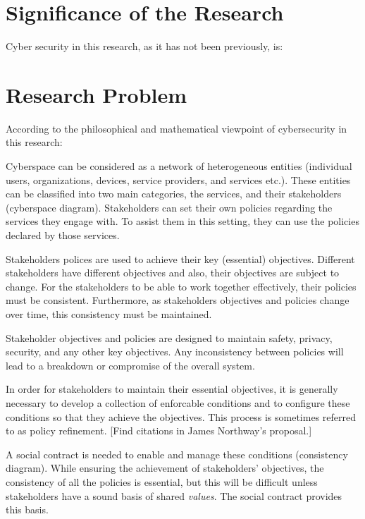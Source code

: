 \section{Significance of the Research}

Cyber security in this research, as it has not been previously, is:


\section{Research Problem}
According to the philosophical and mathematical viewpoint of cybersecurity in this research:

Cyberspace can be considered as a network of heterogeneous entities
(individual users, organizations, devices, service providers, and
services etc.). These entities can be classified into two main categories,
the services, and their stakeholders (cyberspace diagram).  Stakeholders
can set their own policies regarding the services they engage with. To
assist them in this setting, they can use the policies declared by
those services.

Stakeholders polices are used to achieve their key (essential)
objectives. Different stakeholders have different objectives and also,
their objectives are subject to change.  For the stakeholders to be
able to work together effectively, their policies must be consistent.
Furthermore, as stakeholders objectives and policies change over time,
this consistency must be maintained.

Stakeholder objectives and policies are designed to maintain safety, privacy, security,
and any other key objectives. Any inconsistency between policies will lead
to a breakdown or compromise of the overall system.

In order for stakeholders to maintain their essential objectives, it is
generally necessary to develop a collection of enforcable conditions and to configure these conditions so that they achieve the objectives. This process is sometimes referred to as policy refinement. [Find citations in James Northway's
proposal.]

A social contract is needed to enable and manage these conditions (consistency diagram).  While ensuring the achievement of stakeholders’ objectives, the consistency of all the policies is essential, but this will be difficult unless stakeholders have a sound basis of shared {\em values}. The social contract provides this basis.
